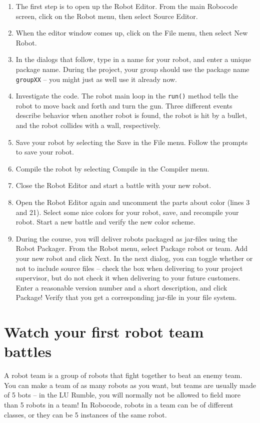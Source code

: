 \documentclass{scrreprt}
\begin{document}
\begin{enumerate}
\item The first step is to open up the Robot Editor. From the main Robocode screen, click on the Robot menu, then select Source Editor.
\item When the editor window comes up, click on the File menu, then select New Robot. 
\item In the dialogs that follow, type in a name for your robot, and enter a unique package name. During the project, your group should use the package name \texttt{groupXX} -- you might just as well use it already now.
\item Investigate the code. The robot main loop in the \texttt{run()} method tells the robot to move back and forth and turn the gun. Three different events describe behavior when another robot is found, the robot is hit by a bullet, and the robot collides with a wall, respectively.
\item Save your robot by selecting the Save in the File menu. Follow the prompts to save your robot. 
\item Compile the robot by selecting Compile in the Compiler menu.
\item Close the Robot Editor and start a battle with your new robot.
\item Open the Robot Editor again and uncomment the parts about color (lines 3 and 21). Select some nice colors for your robot, save, and recompile your robot. Start a new battle and verify the new color scheme. 
\item During the course, you will deliver robots packaged as jar-files using the Robot Packager. From the Robot menu, select Package robot or team. Add your new robot and click Next. In the next dialog, you can toggle whether or not to include source files -- check the box when delivering to your project supervisor, but do not check it when delivering to your future customers. Enter a reasonable version number and a short description, and click Package! Verify that you get a corresponding jar-file in your file system.
\end{enumerate}

\section{Watch your first robot team battles} \label{sec:team}
A robot team is a group of robots that fight together to beat an enemy team. You can make a team of as many robots as you want, but teams are usually made of 5 bots -- in the LU Rumble, you will normally not be allowed to field more than 5 robots in a team! In Robocode, robots in a team can be of different classes, or they can be 5 instances of the same robot.
\end{document}
